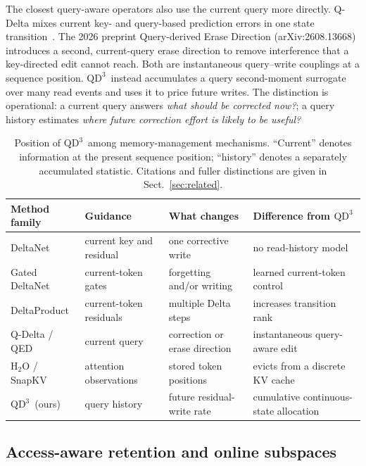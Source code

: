 \documentclass[pdflatex,sn-mathphys-num]{sn-jnl}
\theoremstyle{thmstyleone}
\newcommand{\QDDD}{\ensuremath{\mathrm{QD}^{3}}}
\begin{document}
The closest query-aware operators also use the current query more directly. Q-Delta mixes current key- and query-based prediction errors in one state transition~\cite{park2026qdelta}. The 2026 preprint Query-derived Erase Direction (arXiv:2608.13668) introduces a second, current-query erase direction to remove interference that a key-directed edit cannot reach. Both are instantaneous query--write couplings at a sequence position. \QDDD\ instead accumulates a query second-moment surrogate over many read events and uses it to price future writes. The distinction is operational: a current query answers \emph{what should be corrected now?}; a query history estimates \emph{where future correction effort is likely to be useful?}

\begin{table}[t]
\caption{Position of \QDDD\ among memory-management mechanisms. ``Current'' denotes information at the present sequence position; ``history'' denotes a separately accumulated statistic. Citations and fuller distinctions are given in Sect.~\ref{sec:related}.}
\label{tab:related}
\centering
\small
\setlength{\tabcolsep}{3pt}
\begin{tabular}{@{}p{}p{}p{}p{}@{}}
\toprule
Method family & Guidance & What changes & Difference from \QDDD \\
\midrule
DeltaNet & current key and residual & one corrective write & no read-history model \\
Gated DeltaNet & current-token gates & forgetting and/or writing & learned current-token control \\
DeltaProduct & current-token residuals & multiple Delta steps & increases transition rank \\
Q-Delta / QED & current query & correction or erase direction & instantaneous query-aware edit \\
H$_2$O / SnapKV & attention observations & stored token positions & evicts from a discrete KV cache \\
\QDDD\ (ours) & query history & future residual-write rate & cumulative continuous-state allocation \\
\bottomrule
\end{tabular}
\end{table}

\subsection{Access-aware retention and online subspaces}
\end{document}
